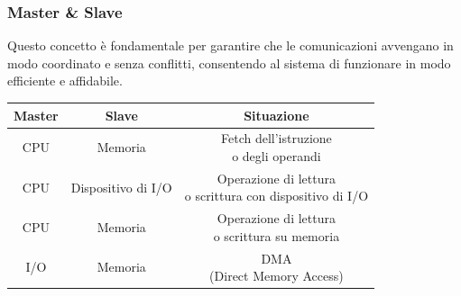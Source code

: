 \begin{frame}
	\frametitle{Master \& Slave}
	
	\begin{block}{}
		Questo concetto è fondamentale per garantire che le comunicazioni avvengano in modo coordinato e senza conflitti, consentendo al sistema di funzionare in modo efficiente e affidabile.
		\begin{table}[]
			\begin{tabular}{|c|c|c|}
			\hline
			\rowcolor[HTML]{ffce93} 
			\textbf{Master} & \textbf{Slave}     & \textbf{Situazione}                                      \\ \hline
			\rowcolor[HTML]{EFEFEF} 
			CPU             & Memoria            & \shortstack{Fetch dell'istruzione\\  o degli operandi}                   \\ \hline
			\rowcolor[HTML]{EFEFEF} 
			CPU             & Dispositivo di I/O & \shortstack{Operazione di lettura \\o scrittura con dispositivo di I/O} \\ \hline
			\rowcolor[HTML]{EFEFEF} 
			CPU             & Memoria            & \shortstack{Operazione di lettura \\o scrittura su memoria}             \\ \hline
			\rowcolor[HTML]{EFEFEF} 
			I/O             & Memoria            & \shortstack{DMA \\(Direct Memory Access)}                               \\ \hline
			\end{tabular}
		\end{table}
		
	\end{block}
	
\end{frame}


